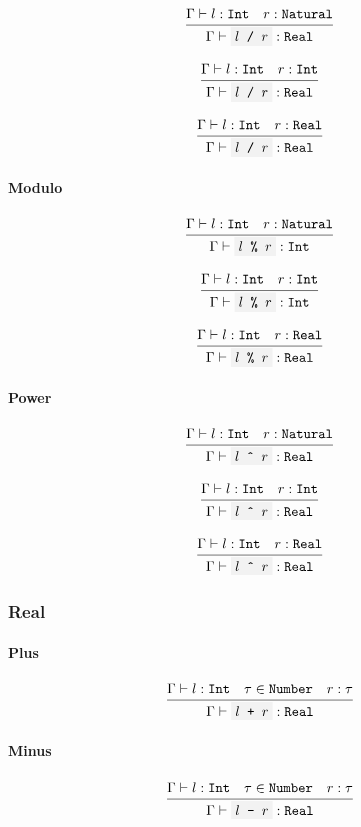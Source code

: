 \documentclass[11pt]{report}
\newcommand{\infrule}[3][gathered]{\frac{\begin{#1}#2\end{#1}}{\begin{gathered}#3\end{gathered}}}
\newcommand{\then}{\vdash}
\newcommand{\code}[1]{\texttt{\colorbox{gray!10}{#1}}}
\newcommand{\Int}{\texttt{Int}}
\newcommand{\Natural}{\texttt{Natural}}
\newcommand{\Real}{\texttt{Real}}
\newcommand{\Env}{\Gamma}
\theoremstyle{definition}
\begin{document}
\[
	\infrule{
		\Env\then l:\Int \quad r:\Natural
	}{
		\Env\then \code{$l$ / $r$} : \Real
	}
\]

\[
	\infrule{
		\Env\then l:\Int \quad r:\Int
	}{
		\Env\then \code{$l$ / $r$} : \Real
	}
\]

\[
	\infrule{
		\Env\then l:\Int \quad r:\Real
	}{
		\Env\then \code{$l$ / $r$} : \Real
	}
\]

\paragraph{Modulo}

\[
	\infrule{
		\Env\then l:\Int \quad r:\Natural
	}{
		\Env\then \code{$l$ \% $r$} : \Int
	}
\]

\[
	\infrule{
		\Env\then l:\Int \quad r:\Int
	}{
		\Env\then \code{$l$ \% $r$} : \Int
	}
\]

\[
	\infrule{
		\Env\then l:\Int \quad r:\Real
	}{
		\Env\then \code{$l$ \% $r$} : \Real
	}
\]

\paragraph{Power}

\[
	\infrule{
		\Env\then l:\Int \quad r:\Natural
	}{
		\Env\then \code{$l$ \^{} $r$} : \Real
	}
\]

\[
	\infrule{
		\Env\then l:\Int \quad r:\Int
	}{
		\Env\then \code{$l$ \^{} $r$} : \Real
	}
\]

\[
	\infrule{
		\Env\then l:\Int \quad r:\Real
	}{
		\Env\then \code{$l$ \^{} $r$} : \Real
	}
\]

\subsubsection{Real}

\paragraph{Plus}

\[
	\infrule{
		\Env\then l:\Int \quad \tau \in \texttt{Number} \quad r:\tau
	}{
		\Env\then \code{$l$ + $r$} : \Real
	}
\]

\paragraph{Minus}

\[
	\infrule{
		\Env\then l:\Int \quad \tau \in \texttt{Number} \quad r:\tau
	}{
		\Env\then \code{$l$ - $r$} : \Real
	}
\]
\end{document}
